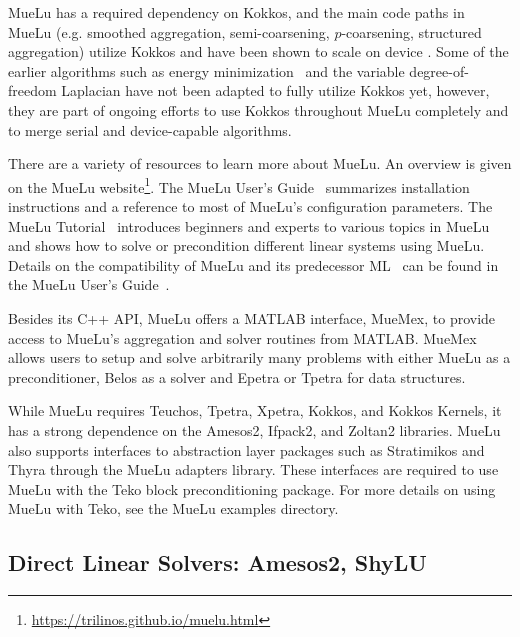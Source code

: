 MueLu has a required dependency on Kokkos,
and the main code paths in MueLu (e.g. smoothed aggregation, semi-coarsening, $p$-coarsening, structured aggregation)
utilize Kokkos and have been shown to scale on device \cite{BettencourtBrownEtAl2021_EmpirePic}.
Some of the earlier algorithms such as energy minimization~\cite{Sala2008a} and the variable degree-of-freedom Laplacian have not been adapted to fully utilize Kokkos yet,
however, they are part of ongoing efforts to use Kokkos throughout MueLu completely and to merge serial and device-capable algorithms.

There are a variety of resources to learn more about MueLu.
An overview is given on the MueLu website\footnote{\url{https://trilinos.github.io/muelu.html}}.
The MueLu User's Guide~\cite{BergerVergiat2023a} summarizes installation instructions and a reference to most of MueLu's configuration parameters.
The MueLu Tutorial~\cite{Mayr2023b} introduces beginners and experts to various topics in MueLu and shows how to solve or precondition different linear systems using MueLu.
Details on the compatibility of MueLu and its predecessor ML~\cite{Heroux2005a,Gee2006a} can be found in the MueLu User's Guide~\cite{BergerVergiat2023a}.

Besides its C++ API, MueLu offers a MATLAB interface, MueMex, to provide access to MueLu's aggregation and solver routines from MATLAB.
MueMex allows users to setup and solve arbitrarily many problems with either MueLu as a preconditioner, Belos as a solver and Epetra or Tpetra for data structures.

While MueLu requires Teuchos, Tpetra, Xpetra, Kokkos, and Kokkos Kernels, it has a strong dependence
on the Amesos2, Ifpack2, and Zoltan2 libraries.
MueLu also supports interfaces to abstraction layer packages such as Stratimikos and Thyra through the MueLu adapters library.
These interfaces are required to use MueLu with the Teko block preconditioning package.
For more details on using MueLu with Teko, see the MueLu examples directory.

\subsection{Direct Linear Solvers: Amesos2, ShyLU}

